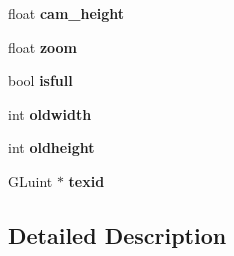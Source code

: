 \begin{DoxyCompactItemize}
\item 
\hypertarget{group___b_i_k_e___v_a_r_i_a_b_l_e_s_ga06650971048a8ba44a7dfa1f013e5447}{float {\bfseries cam\-\_\-height}}\label{group___b_i_k_e___v_a_r_i_a_b_l_e_s_ga06650971048a8ba44a7dfa1f013e5447}

\item 
\hypertarget{group___b_i_k_e___v_a_r_i_a_b_l_e_s_ga15776f201dc8b554110222e67a51cbae}{float {\bfseries zoom}}\label{group___b_i_k_e___v_a_r_i_a_b_l_e_s_ga15776f201dc8b554110222e67a51cbae}

\item 
\hypertarget{group___b_i_k_e___v_a_r_i_a_b_l_e_s_gabea147fd3d452f9dc214c749f0128759}{bool {\bfseries isfull}}\label{group___b_i_k_e___v_a_r_i_a_b_l_e_s_gabea147fd3d452f9dc214c749f0128759}

\item 
\hypertarget{group___b_i_k_e___v_a_r_i_a_b_l_e_s_ga1c3c7c66304ffe1bc426f8df0edc0750}{int {\bfseries oldwidth}}\label{group___b_i_k_e___v_a_r_i_a_b_l_e_s_ga1c3c7c66304ffe1bc426f8df0edc0750}

\item 
\hypertarget{group___b_i_k_e___v_a_r_i_a_b_l_e_s_ga7428a7d1956fd97a86598e33e73f68ec}{int {\bfseries oldheight}}\label{group___b_i_k_e___v_a_r_i_a_b_l_e_s_ga7428a7d1956fd97a86598e33e73f68ec}

\item 
\hypertarget{group___b_i_k_e___v_a_r_i_a_b_l_e_s_ga27d5bfe08b944d489776bccc754ce9d6}{G\-Luint $\ast$ {\bfseries texid}}\label{group___b_i_k_e___v_a_r_i_a_b_l_e_s_ga27d5bfe08b944d489776bccc754ce9d6}

\end{DoxyCompactItemize}


\subsection{Detailed Description}
